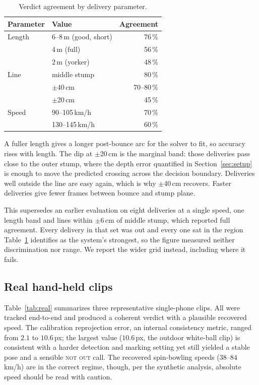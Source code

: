 \documentclass[journal]{IEEEtran}
\begin{document}
\begin{table}[!t]
\caption{Verdict agreement by delivery parameter.}
\label{tab:wide_break}
\centering
\begin{tabular}{@{}llr@{}}
\toprule
\textbf{Parameter} & \textbf{Value} & \textbf{Agreement}\\
\midrule
Length & 6--8\,m (good, short) & 76\,\%\\
       & 4\,m (full)           & 56\,\%\\
       & 2\,m (yorker)         & 48\,\%\\
\midrule
Line   & middle stump          & 80\,\%\\
       & $\pm$40\,cm           & 70--80\,\%\\
       & $\pm$20\,cm           & 45\,\%\\
\midrule
Speed  & 90--105\,km/h         & 70\,\%\\
       & 130--145\,km/h        & 60\,\%\\
\bottomrule
\end{tabular}
\end{table}

A fuller length gives a longer post-bounce arc for the solver to fit, so accuracy rises with
length. The dip at $\pm$20\,cm is the marginal band: those deliveries pass close to the outer
stump, where the depth error quantified in Section~\ref{sec:setup} is enough to move the predicted
crossing across the decision boundary. Deliveries well outside the line are easy again, which is
why $\pm$40\,cm recovers. Faster deliveries give fewer frames between bounce and stump plane.

This supersedes an earlier evaluation on eight deliveries at a single speed, one length band and
lines within $\pm$6\,cm of middle stump, which reported full agreement. Every delivery in that set
was out and every one sat in the region Table~\ref{tab:wide_break} identifies as the system's
strongest, so the figure measured neither discrimination nor range. We report the wider grid
instead, including where it fails.

\subsection{Real hand-held clips}
Table~\ref{tab:real} summarizes three representative single-phone clips. All
were tracked end-to-end and produced a coherent verdict with a plausible
recovered speed. The calibration reprojection error, an internal consistency
metric, ranged from $2.1$ to $10.6$\,px; the largest value ($10.6$\,px, the
outdoor white-ball clip) is consistent with a harder detection and marking
setting yet still yielded a stable pose and a sensible \textsc{not out} call.
The recovered spin-bowling speeds ($38$--$84$\,km/h) are in the correct regime,
though, per the synthetic analysis, absolute speed should be read with caution.
\end{document}
